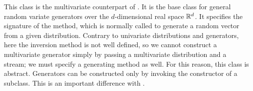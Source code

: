 
This class is the multivariate counterpart of
.
It is the base class for general random variate generators over
the $d$-dimensional real space $\mathbb{R}^d$.
It specifies the signature of the  method, which is
normally called to generate a random vector from a given distribution.
Contrary to univariate distributions and generators, here the inversion method
is not well defined, so we cannot construct a multivariate generator simply
by passing a multivariate distribution and a stream; we must specify a
generating method as well.  For this reason, this class is abstract.
Generators can be constructed only by invoking the constructor of a subclass.
This is an important difference with
.



